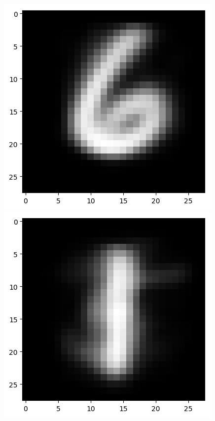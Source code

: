 \documentclass[submit]{harvardml}
\begin{document}
\begin{enumerate}
        \includegraphics[scale=0.3]{figures/k3_centroids/8.png} \\
        \includegraphics[scale=0.3]{figures/k3_centroids/0.png} \\

\end{enumerate}
\end{document}
